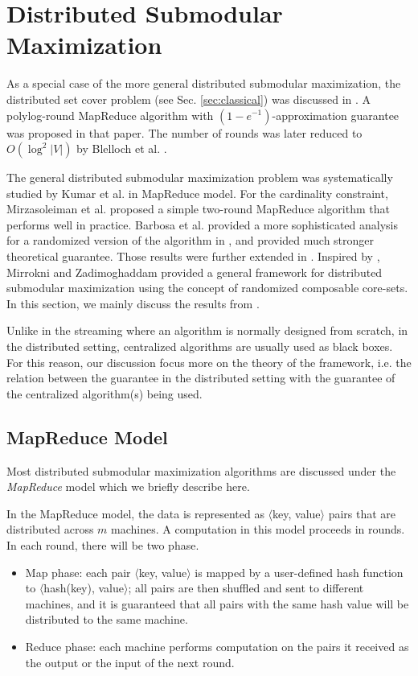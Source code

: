 \section{Distributed Submodular Maximization}
As a special case of the more general distributed submodular maximization, the distributed set cover problem (see Sec. \ref{sec:classical}) was discussed in \cite{CKT10}. A polylog-round MapReduce algorithm with $(1-e^{-1})$-approximation guarantee was proposed in that paper. The number of rounds was later reduced to $O(\log^2 |V|)$  by Blelloch et al. \cite{BST12}. 

  The general distributed submodular maximization problem was systematically studied by Kumar et al. \cite{KMV+15} in MapReduce model.  For the cardinality constraint, Mirzasoleiman et al. \cite{MKS+13} proposed a simple two-round MapReduce algorithm that performs well in practice. Barbosa et al. \cite{DEN+15} provided a more sophisticated analysis for a randomized version of the  algorithm in \cite{MKS+13}, and provided much stronger theoretical guarantee. Those results were further extended in \cite{BAN+2015new}. Inspired by \cite{MKS+13}, Mirrokni and Zadimoghaddam \cite{MZ15} provided a general framework for distributed submodular maximization using the concept of randomized composable core-sets. In this section, we mainly discuss the results from \cite{KMV+15,MKS+13,DEN+15,BAN+2015new,MZ15}.

Unlike in the streaming  where an algorithm is normally designed from scratch, in the distributed setting, centralized algorithms are usually used as black boxes. For this reason, our discussion focus more on the theory of the framework, i.e. the relation between the guarantee in the distributed setting with the guarantee of the centralized algorithm(s) being used.


\subsection{MapReduce Model}
Most distributed submodular maximization algorithms are discussed under the \emph{MapReduce} model \cite{DG08} which we briefly describe here.

In the MapReduce model, the data is represented as $\langle$key, value$\rangle$ pairs that are distributed across $m$ machines. A computation in this model proceeds in rounds. In each round, there will be two phase.
\begin{itemize}
\item Map phase: each pair $\langle$key, value$\rangle$ is mapped by a user-defined hash function to $\langle$hash(key), value$\rangle$; all pairs are then shuffled and sent to different machines, and it is guaranteed that all pairs with the same hash value  will be distributed to the same machine.
\item Reduce phase: each machine performs computation on the pairs it received as the output or the input of the next round.
\end{itemize}

